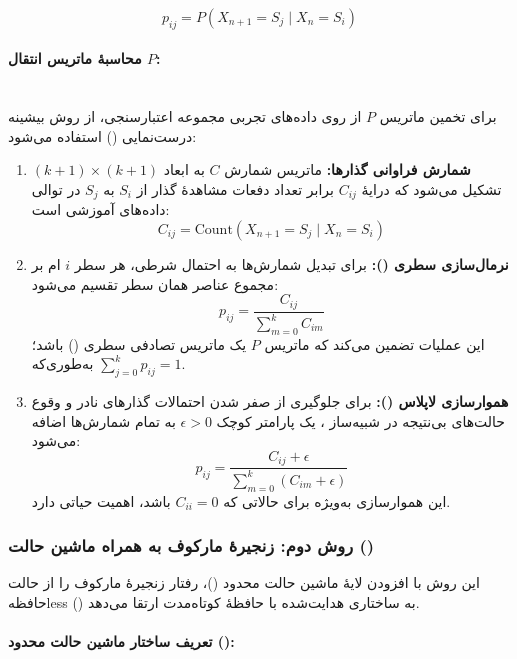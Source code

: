 \documentclass[a4paper, 10pt, twocolumn]{article}
\begin{document}
	$$p_{ij} = P(X_{n+1} = S_j \mid X_n = S_i)$$
	
	\paragraph{محاسبهٔ ماتریس انتقال $P$: }\mbox{} \\
	
	برای تخمین ماتریس $P$ از روی داده‌های تجربی مجموعه اعتبارسنجی، از روش بیشینه درست‌نمایی () استفاده می‌شود:
	
	\begin{enumerate}
		\item \textbf{شمارش فراوانی گذارها:} ماتریس شمارش $C$ به ابعاد $(k+1) \times (k+1)$ تشکیل می‌شود که درایهٔ $C_{ij}$ برابر تعداد دفعات مشاهدهٔ گذار از $S_i$ به $S_j$ در توالی داده‌های آموزشی است:
		$$C_{ij} = \text{Count}(X_{n+1} = S_j \mid X_n = S_i)$$
		
		\item \textbf{نرمال‌سازی سطری ():} برای تبدیل شمارش‌ها به احتمال شرطی، هر سطر $i$ ام بر مجموع عناصر همان سطر تقسیم می‌شود:
		$$p_{ij} = \frac{C_{ij}}{\sum_{m=0}^{k} C_{im}} $$
		این عملیات تضمین می‌کند که ماتریس $P$ یک ماتریس تصادفی سطری () باشد؛ به‌طوری‌که $\sum_{j=0}^{k} p_{ij} = 1$.
		
		\item \textbf{هموارسازی لاپلاس ():} برای جلوگیری از صفر شدن احتمالات گذارهای نادر و وقوع حالت‌های بی‌نتیجه در شبیه‌ساز ، یک پارامتر کوچک $\epsilon > 0$ به تمام شمارش‌ها اضافه می‌شود:
		$$p_{ij} = \frac{C_{ij} + \epsilon}{\sum_{m=0}^{k} (C_{im} + \epsilon)} $$
		این هموارسازی به‌ویژه برای حالاتی که $C_{ii} = 0$ باشد، اهمیت حیاتی دارد.
	\end{enumerate}
	
	
	\subsubsection*{روش دوم: زنجیرهٔ مارکوف به همراه ماشین حالت ()}
	
	این روش با افزودن لایهٔ ماشین حالت محدود ()، رفتار زنجیرهٔ مارکوف را از حالت حافظه‌less () به ساختاری هدایت‌شده با حافظهٔ کوتاه‌مدت ارتقا می‌دهد.
	
	\paragraph{تعریف ساختار ماشین حالت محدود (): } \mbox{} \\
	
\end{document}
